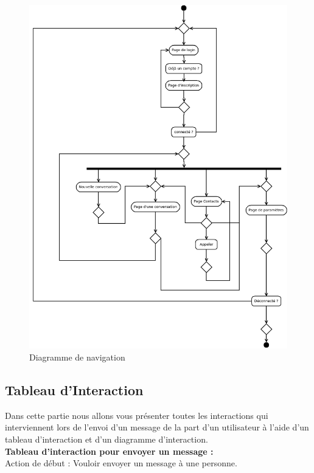 	\begin{figure}[H]
		\centerline{\includegraphics[width=16.5cm]{img/navigation.png}}
		\caption{Diagramme de navigation}
	\end{figure}


	\subsection{Tableau d’Interaction}

	Dans cette partie nous allons vous présenter toutes les interactions qui interviennent lors de l'envoi d'un message de la part d'un utilisateur à l'aide d'un tableau d’interaction et d'un diagramme d’interaction. \\

	\textbf{Tableau d’interaction pour envoyer un message :} \\

	Action de début : Vouloir envoyer un message à une personne. \\

